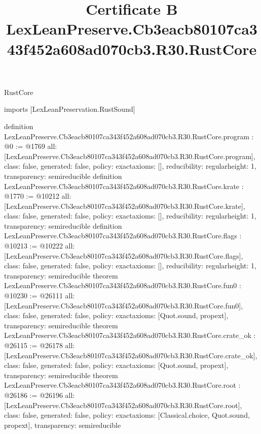 \begin{lexlean}{RustCore}
\title{Certificate B LexLeanPreserve.Cb3eacb80107ca343f452a608ad070cb3.R30.RustCore}
\begin{coremodule}
imports [LexLeanPreservation.RustSound]

definition LexLeanPreserve.Cb3eacb80107ca343f452a608ad070cb3.R30.RustCore.program : @0 := @1769 {
  all: [LexLeanPreserve.Cb3eacb80107ca343f452a608ad070cb3.R30.RustCore.program],
  class: false,
  generated: false,
  policy: exact{axioms: []},
  reducibility: regular{height: 1},
  transparency: semireducible
}
definition LexLeanPreserve.Cb3eacb80107ca343f452a608ad070cb3.R30.RustCore.krate : @1770 := @10212 {
  all: [LexLeanPreserve.Cb3eacb80107ca343f452a608ad070cb3.R30.RustCore.krate],
  class: false,
  generated: false,
  policy: exact{axioms: []},
  reducibility: regular{height: 1},
  transparency: semireducible
}
definition LexLeanPreserve.Cb3eacb80107ca343f452a608ad070cb3.R30.RustCore.flags : @10213 := @10222 {
  all: [LexLeanPreserve.Cb3eacb80107ca343f452a608ad070cb3.R30.RustCore.flags],
  class: false,
  generated: false,
  policy: exact{axioms: []},
  reducibility: regular{height: 1},
  transparency: semireducible
}
theorem LexLeanPreserve.Cb3eacb80107ca343f452a608ad070cb3.R30.RustCore.fun0 : @10230 := @26111 {
  all: [LexLeanPreserve.Cb3eacb80107ca343f452a608ad070cb3.R30.RustCore.fun0],
  class: false,
  generated: false,
  policy: exact{axioms: [Quot.sound, propext]},
  transparency: semireducible
}
theorem LexLeanPreserve.Cb3eacb80107ca343f452a608ad070cb3.R30.RustCore.crate_ok : @26115 := @26178 {
  all: [LexLeanPreserve.Cb3eacb80107ca343f452a608ad070cb3.R30.RustCore.crate_ok],
  class: false,
  generated: false,
  policy: exact{axioms: [Quot.sound, propext]},
  transparency: semireducible
}
theorem LexLeanPreserve.Cb3eacb80107ca343f452a608ad070cb3.R30.RustCore.root : @26186 := @26196 {
  all: [LexLeanPreserve.Cb3eacb80107ca343f452a608ad070cb3.R30.RustCore.root],
  class: false,
  generated: false,
  policy: exact{axioms: [Classical.choice, Quot.sound, propext]},
  transparency: semireducible
}


\end{coremodule}
\end{lexlean}
